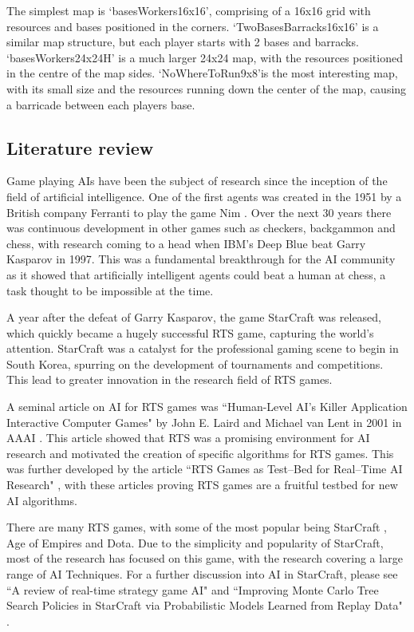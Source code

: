 \documentclass[]{article}
\begin{document}
The simplest map is `basesWorkers16x16', comprising of a 16x16 grid with resources and bases positioned in the corners. `TwoBasesBarracks16x16' is a similar map structure, but each player starts with 2 bases and barracks. `basesWorkers24x24H' is a much larger 24x24 map, with the resources positioned in the centre of the map sides. `NoWhereToRun9x8'is the most interesting map, with its small size and the resources running down the center of the map, causing a barricade between each players base.



\subsection{Literature review}

Game playing AIs have been the subject of research since the inception of the field of artificial intelligence. One of the first agents was created in the 1951 by a British company Ferranti to play the game Nim \cite{Nimrodth26:online}. Over the next 30 years there was continuous development in other games such as checkers, backgammon and chess, with research coming to a head when IBM’s Deep Blue beat Garry Kasparov in 1997. This was a fundamental breakthrough for the AI community as it showed that artificially intelligent agents could beat a human at chess, a task thought to be impossible at the time.

A year after the defeat of Garry Kasparov, the game StarCraft was released, which quickly became a hugely successful RTS game, capturing the world’s attention. StarCraft was a catalyst for the professional gaming scene to begin in South Korea, spurring on the development of tournaments and competitions. This lead to greater innovation in the research field of RTS games.

A seminal article on AI for RTS games was ``Human-Level AI's Killer Application Interactive Computer Games" by John E. Laird and Michael van Lent in 2001 in AAAI  \cite{laird2001human}. This article showed that RTS was a promising environment for AI research and motivated the creation of specific algorithms for RTS games. This was further developed by the article ``RTS Games as Test–Bed for Real–Time AI Research" \cite{buro2003rts}, with these articles proving RTS games are a fruitful testbed for new AI algorithms.

There are many RTS games, with some of the most popular being StarCraft \cite{ontanon2013survey}, Age of Empires \cite{buro2003real} and Dota. Due to the simplicity and popularity of StarCraft, most of the research has focused on this game, with the research covering a large range of AI Techniques. For a further discussion into AI in StarCraft, please see ``A review of real-time strategy game AI" \cite{robertson2014review} and ``Improving Monte Carlo Tree Search Policies in StarCraft via Probabilistic Models Learned from Replay Data" \cite{uriarte2016improving}.
\end{document}
